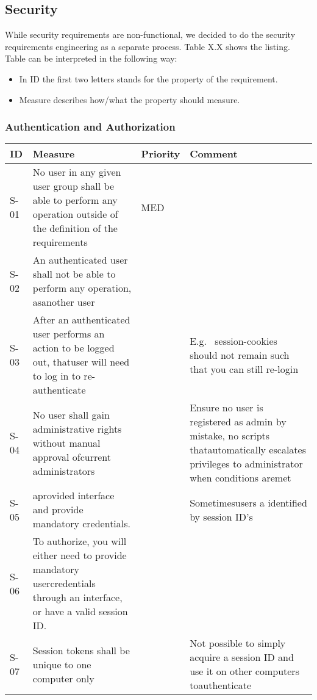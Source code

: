 \subsection{Security}
While security requirements are non-functional, we decided to do the
security requirements engineering as a separate process. Table X.X
shows the listing.
Table can be interpreted in the following way:
\begin{itemize}
    \item In ID the first two letters stands for the property of the requirement.
    \item Measure describes how/what the property should measure.
\end{itemize}

\subsubsection{Authentication and Authorization}
\begin{supertabular}{|l|p{7cm}|l|p{5cm}|}
\hline
\textbf{ID} & \textbf{Measure} & \textbf{Priority} & \textbf{Comment} \\ 
\hline

S-01 & No user in any given user group shall be able to perform any operation
outside of the definition of the requirements & MED & \\ 
\hline

S-02 & An authenticated user shall not be able to perform any operation,
asanother user & & \\ 
\hline

S-03 & After an authenticated user performs an action to be logged out,
thatuser will need to log in to re-authenticate & & E.g. \ session-cookies
should not remain such that you can still re-login\\ 
\hline

S-04 & No user shall gain administrative rights without manual approval
ofcurrent administrators & & Ensure no user is registered as admin by mistake,
no scripts thatautomatically escalates privileges to administrator when
conditions aremet\\ 
\hline

S-05 & aprovided interface and provide mandatory credentials. & &
Sometimesusers a identified by session ID's\\ 
\hline

S-06 & To authorize, you will either need to provide mandatory usercredentials
through an interface, or have a valid session ID. & & \\ 
\hline

S-07 & Session tokens shall be unique to one computer only & & Not possible to
simply acquire a session ID and use it on other computers toauthenticate\\
\hline

\end{supertabular}

